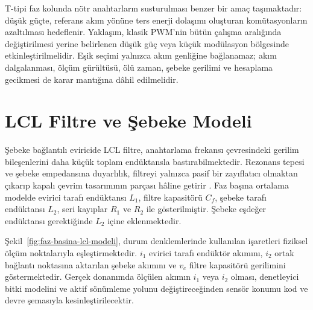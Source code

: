 T-tipi faz kolunda nötr anahtarların susturulması benzer bir amaç taşımaktadır: düşük güçte, referans akım yönüne ters enerji dolaşımı oluşturan komütasyonların azaltılması hedeflenir. Yaklaşım, klasik PWM'nin bütün çalışma aralığında değiştirilmesi yerine belirlenen düşük güç veya küçük modülasyon bölgesinde etkinleştirilmelidir. Eşik seçimi yalnızca akım genliğine bağlanamaz; akım dalgalanması, ölçüm gürültüsü, ölü zaman, şebeke gerilimi ve hesaplama gecikmesi de karar mantığına dâhil edilmelidir.

\section{LCL Filtre ve Şebeke Modeli}

Şebeke bağlantılı eviricide LCL filtre, anahtarlama frekansı çevresindeki gerilim bileşenlerini daha küçük toplam endüktansla bastırabilmektedir. Rezonans tepesi ve şebeke empedansına duyarlılık, filtreyi yalnızca pasif bir zayıflatıcı olmaktan çıkarıp kapalı çevrim tasarımının parçası hâline getirir \citep{Zhang2014PR,Lu2016}. Faz başına ortalama modelde evirici tarafı endüktansı $L_1$, filtre kapasitörü $C_f$, şebeke tarafı endüktansı $L_2$, seri kayıplar $R_1$ ve $R_2$ ile gösterilmiştir. Şebeke eşdeğer endüktansı gerektiğinde $L_2$ içine eklenmektedir.

Şekil~\ref{fig:faz-basina-lcl-modeli}, durum denklemlerinde kullanılan işaretleri fiziksel ölçüm noktalarıyla eşleştirmektedir. $i_1$ evirici tarafı endüktör akımını, $i_2$ ortak bağlantı noktasına aktarılan şebeke akımını ve $v_c$ filtre kapasitörü gerilimini göstermektedir. Gerçek donanımda ölçülen akımın $i_1$ veya $i_2$ olması, denetleyici bitki modelini ve aktif sönümleme yolunu değiştireceğinden sensör konumu kod ve devre şemasıyla kesinleştirilecektir.

